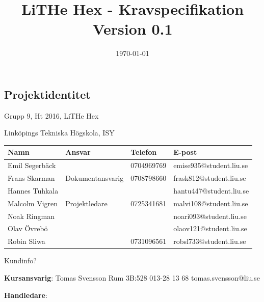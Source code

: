 \documentclass[a4paper,titlepage,12pt]{article}
\begin{document}
    \title{\textbf{LiTHe Hex - Kravspecifikation} \\
        \vspace*{0.5\baselineskip}
        Version 0.1}

    \date{\today}

	\maketitle
	\newpage

	
	\begin{center}


		\section*{Projektidentitet}
		Grupp 9, Ht 2016, LiTHe Hex

		Linköpings Tekniska Högskola, ISY

		\begin{table}[h]
			\begin{tabular}[pos]{| l | l | l | l |}
				\hline
				\textbf{Namn} & \textbf{Ansvar} & \textbf{Telefon} & \textbf{E-post} \\ \hline
				Emil Segerbäck & & 0704969769 & emise935@student.liu.se \\ \hline
				Frans Skarman & Dokumentansvarig & 0708798660 & frask812@student.liu.se \\ \hline
				Hannes Tuhkala & & & hantu447@student.liu.se \\ \hline
				Malcolm Vigren & Projektledare & 0725341681 & malvi108@student.liu.se \\ \hline
				Noak Ringman &  & & noari093@student.liu.se \\ \hline
				Olav Övrebö &  &  & olaov121@student.liu.se \\ \hline
				Robin Sliwa &  & 0731096561 & robsl733@student.liu.se \\ \hline
			\end{tabular}
		\end{table}


		Kundinfo?

		\textbf{Kursansvarig}: Tomas Svensson Rum 3B:528 013-28 13 68 tomas.svensson@liu.se

		\textbf{Handledare}:



\end{center}
\end{document}
